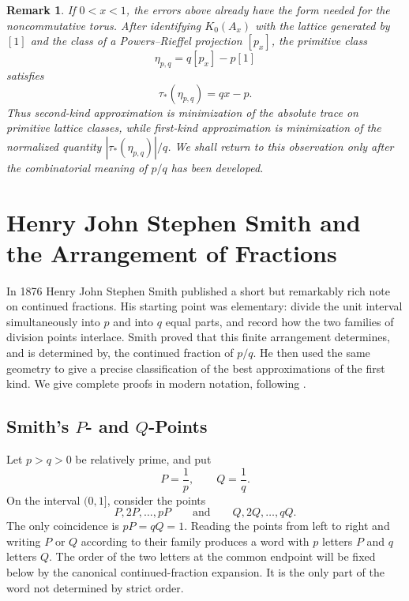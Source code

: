 \documentclass{book}
\newtheorem{remark}[definition]{Remark}
\begin{document}
\begin{remark}\label{rem:CFPreviewKTheory}
  If \(0<x<1\), the errors above already have the form needed for the
  noncommutative torus. After identifying \(K_0(A_x)\) with the lattice
  generated by \([1]\) and the class of a Powers--Rieffel projection
  \([p_x]\), the primitive class
  \[
    \eta_{p,q}=q[p_x]-p[1]
  \]
  satisfies
  \[
    \tau_*(\eta_{p,q})=qx-p.
  \]
  Thus second-kind approximation is minimization of the absolute trace on
  primitive lattice classes, while first-kind approximation is minimization
  of the normalized quantity \(|\tau_*(\eta_{p,q})|/q\). We shall return to
  this observation only after the combinatorial meaning of \(p/q\) has been
  developed.
\end{remark}

\chapter[Smith and Continued Fractions]
        {Henry John Stephen Smith and the Arrangement of Fractions}

In 1876 Henry John Stephen Smith published a short but remarkably rich note
on continued fractions. His starting point was elementary: divide the unit
interval simultaneously into \(p\) and into \(q\) equal parts, and record how
the two families of division points interlace. Smith proved that this finite
arrangement determines, and is determined by, the continued fraction of
\(p/q\). He then used the same geometry to give a precise classification of
the best approximations of the first kind. We give complete proofs in modern
notation, following \cite{Smith1876}.

\section{Smith's \texorpdfstring{\(P\)- and \(Q\)-Points}{P- and Q-Points}}

Let \(p>q>0\) be relatively prime, and put
\[
  P=\frac1p,\qquad Q=\frac1q.
\]
On the interval \((0,1]\), consider the points
\[
  P,2P,\ldots,pP
  \qquad\text{and}\qquad
  Q,2Q,\ldots,qQ.
\]
The only coincidence is \(pP=qQ=1\). Reading the points from left to right
and writing \(P\) or \(Q\) according to their family produces a word with
\(p\) letters \(P\) and \(q\) letters \(Q\). The order of the two letters at
the common endpoint will be fixed below by the canonical continued-fraction
expansion. It is the only part of the word not determined by strict order.
\end{document}
